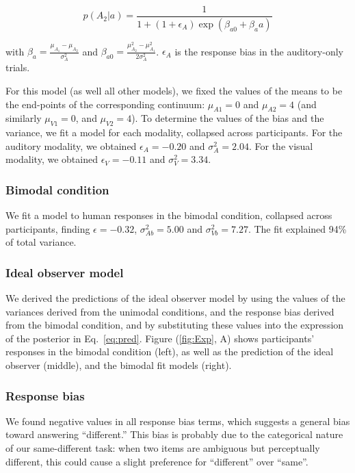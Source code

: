 \documentclass[10pt,letterpaper]{article}
\begin{document}
\begin{equation}
p(A_2 | a)=\frac{1}{1+(1+\epsilon_A)\exp(\beta_{a0}+\beta_aa)}
\end{equation}

\noindent with $\beta_a=\frac{\mu_{A_1}-\mu_{A_2}}{\sigma^2_{A}}$ and  $\beta_{a0}=\frac{\mu^2_{A_2}-\mu^2_{A_1}}{2\sigma^2_{A}}$. $\epsilon_A$ is the response bias in the auditory-only trials.

For this model (as well all other models), we fixed the values of the means to be the end-points of the corresponding continuum: $\mu_{A1}=0$ and $\mu_{A2}=4$ (and similarly $\mu_{V1}=0$, and $\mu_{V2}=4$). To determine the values of the bias and the variance, we fit a model for each modality, collapsed across participants. For the auditory modality, we obtained $\epsilon_A=-0.20$ and $\sigma^2_A=2.04$. For the visual modality, we obtained $\epsilon_V=-0.11$ and $\sigma^2_V=3.34$.

\subsubsection{Bimodal condition}
We fit a model to human responses in the bimodal condition, collapsed across participants, finding $\epsilon=-0.32$, $\sigma^2_{Ab}=5.00$ and $\sigma^2_{Vb}=7.27$. The fit explained 94\% of total variance.

\subsubsection{Ideal observer model}

We derived the predictions of the ideal observer model by using the values of the variances derived from the unimodal conditions, and the response bias derived from the bimodal condition, and by substituting these values into the expression of the posterior in Eq.~\ref{eq:pred}.
Figure (\ref{fig:Exp}, A) shows participants' responses in the bimodal condition (left), as well as the prediction of the ideal observer (middle), and the bimodal fit models (right).

\subsubsection{Response bias}

We found negative values in all response bias terms, which suggests a general bias toward answering ``different.''  This bias is probably due to the categorical nature of our same-different task: when two items are ambiguous but perceptually different, this could cause a slight preference for ``different'' over ``same''.
\end{document}
